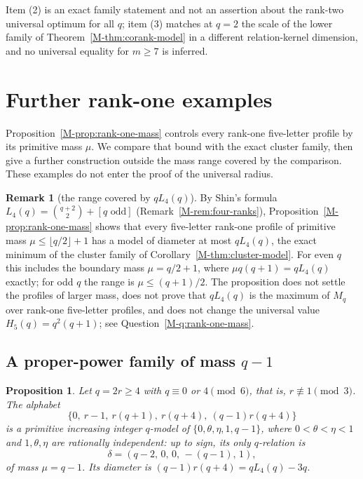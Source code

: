 \documentclass[11pt,reqno]{amsart}
\theoremstyle{plain}
\newtheorem{proposition}[theorem]{Proposition}
\theoremstyle{definition}
\newtheorem{remark}[theorem]{Remark}
\theoremstyle{plain}
\theoremstyle{plain}
\theoremstyle{plain}
\theoremstyle{plain}
\theoremstyle{plain}
\theoremstyle{plain}
\theoremstyle{definition}
\theoremstyle{definition}
\theoremstyle{definition}
\theoremstyle{plain}
\begin{document}
Item (2) is an exact family statement and not an assertion about the
rank-two universal optimum for all $q$; item (3) matches at $q=2$ the scale
of the lower family of Theorem~\ref{M-thm:corank-model} in a different
relation-kernel dimension, and no universal equality for $m\ge7$ is
inferred.

\section{Further rank-one examples}\label{M-sec:rank-sensitive}

Proposition~\ref{M-prop:rank-one-mass} controls every rank-one five-letter
profile by its primitive mass $\mu$. We compare that bound with the
exact cluster family, then give a further construction outside the mass
range covered by the comparison. These examples do not enter the proof
of the universal radius.

\begin{remark}[the range covered by $qL_4(q)$]\label{M-rem:mass-range}
By Shin's formula $L_4(q)=\binom{q+2}{2}+[q\text{ odd}]$
\cite[Theorem~10.3]{M-Shin26} (Remark~\ref{M-rem:four-ranks}),
Proposition~\ref{M-prop:rank-one-mass} shows that every five-letter rank-one
profile of primitive mass $\mu\le\lfloor q/2\rfloor+1$ has a model of
diameter at most $qL_4(q)$, the exact minimum of the cluster family of
Corollary~\ref{M-thm:cluster-model}. For even $q$ this includes the boundary
mass $\mu=q/2+1$, where $\mu q(q+1)=qL_4(q)$ exactly; for odd $q$ the range
is $\mu\le(q+1)/2$. The proposition does not settle the profiles of larger
mass, does not prove that $qL_4(q)$ is the maximum of $M_q$ over rank-one
five-letter profiles, and does not change the universal value
$H_5(q)=q^2(q+1)$; see Question~\ref{M-q:rank-one-mass}.
\end{remark}

\subsection{A proper-power family of mass $q-1$}

\begin{proposition}\label{M-prop:proper-power}
Let $q=2r\ge4$ with $q\equiv0$ or $4\pmod6$, that is, $r\not\equiv1\pmod3$.
The alphabet
\begin{equation}\label{M-eq:proper-power-alphabet}
 \{0,\ r-1,\ r(q+1),\ r(q+4),\ (q-1)r(q+4)\}
\end{equation}
is a primitive increasing integer $q$-model of $\{0,\theta,\eta,1,q-1\}$,
where $0<\theta<\eta<1$ and $1,\theta,\eta$ are rationally independent: up
to sign, its only $q$-relation is
\[
 \delta=(q-2,\,0,\,0,\,-(q-1),\,1),
\]
of mass $\mu=q-1$. Its diameter is $(q-1)r(q+4)=qL_4(q)-3q$.
\end{proposition}
\end{document}
